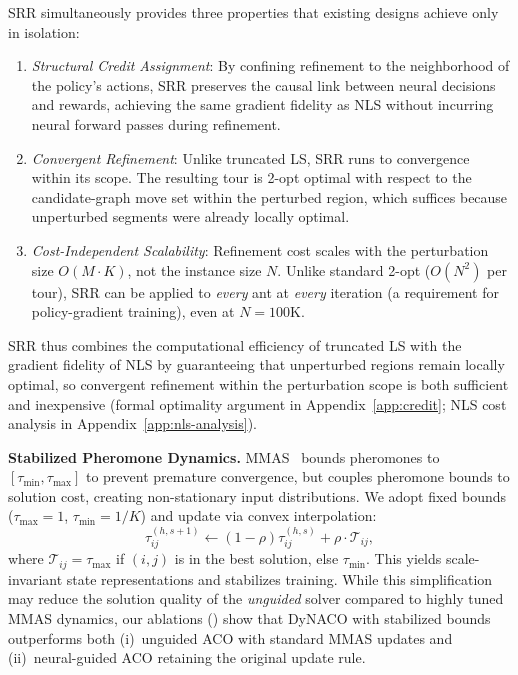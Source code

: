 \documentclass[sigconf,review]{acmart}
\newcommand{\MMAS}{\textsc{MMAS}}
\begin{document}
SRR simultaneously provides three properties that existing designs achieve only in isolation:
\begin{enumerate}
    \item \emph{Structural Credit Assignment}: By confining refinement to the neighborhood of the policy's actions, SRR preserves the causal link between neural decisions and rewards, achieving the same gradient fidelity as NLS without incurring neural forward passes during refinement.
    \item \emph{Convergent Refinement}: Unlike truncated LS, SRR runs to convergence within its scope.  The resulting tour is 2-opt optimal with respect to the candidate-graph move set within the perturbed region, which suffices because unperturbed segments were already locally optimal.
    \item \emph{Cost-Independent Scalability}: Refinement cost scales with the perturbation size $O(M{\cdot}K)$, not the instance size $N$.  Unlike standard 2-opt ($O(N^2)$ per tour), SRR can be applied to \emph{every} ant at \emph{every} iteration (a requirement for policy-gradient training), even at $N{=}100$K.
\end{enumerate}
\noindent SRR thus combines the computational efficiency of truncated LS with the gradient fidelity of NLS by guaranteeing that unperturbed regions remain locally optimal, so convergent refinement within the perturbation scope is both sufficient and inexpensive (formal optimality argument in Appendix~\ref{app:credit}; NLS cost analysis in Appendix~\ref{app:nls-analysis}).

\smallskip\noindent\textbf{Stabilized Pheromone Dynamics.}
\label{sec:smoothed-mmas}
\MMAS{}~\cite{maxmin} bounds pheromones to $[\tau_{\min}, \tau_{\max}]$ to prevent premature convergence, but couples pheromone bounds to solution cost, creating non-stationary input distributions.
We adopt fixed bounds ($\tau_{\max}=1$, $\tau_{\min}=1/K$) and update via convex interpolation:
\begin{equation}
\tau^{(h,s+1)}_{ij} \leftarrow (1-\rho)\tau^{(h,s)}_{ij} + \rho \cdot \mathcal{T}_{ij},
\label{eq:smoothed-mmas}
\end{equation}
where $\mathcal{T}_{ij} = \tau_{\max}$ if $(i,j)$ is in the best solution, else $\tau_{\min}$.
This yields scale-invariant state representations and stabilizes training.
While this simplification may reduce the solution quality of the \emph{unguided} solver compared to highly tuned \MMAS{} dynamics, our ablations () show that DyNACO with stabilized bounds outperforms both (i)~unguided ACO with standard \MMAS{} updates and (ii)~neural-guided ACO retaining the original update rule.
\end{document}
